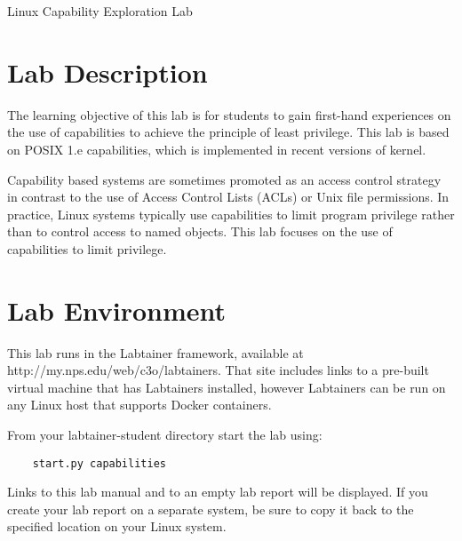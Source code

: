 




\begin{center}
{\LARGE Linux Capability Exploration Lab}
\end{center}

\copyrightnotice

\section{Lab Description}

The learning objective of this lab is for students
to gain first-hand experiences on the
use of capabilities to achieve the principle of least privilege.
This lab is based on POSIX 1.e capabilities, which is implemented in
recent versions of \linux kernel.

Capability based systems are sometimes promoted as an access control
strategy in contrast to the use of Access Control Lists (ACLs) or
Unix file permissions.  In practice, Linux systems typically use 
capabilities to limit program privilege rather than to control
access to named objects.  This lab focuses on the use of capabilities
to limit privilege.

\section{Lab Environment}
This lab runs in the Labtainer framework,
available at http://my.nps.edu/web/c3o/labtainers.
That site includes links to a pre-built virtual machine
that has Labtainers installed, however Labtainers can
be run on any Linux host that supports Docker containers.

From your labtainer-student directory start the lab using:
\begin{verbatim}
    start.py capabilities
\end{verbatim}
Links to this lab manual and to an empty lab report will be displayed.  If you create your lab report on a separate system,
be sure to copy it back to the specified location on your Linux system.

